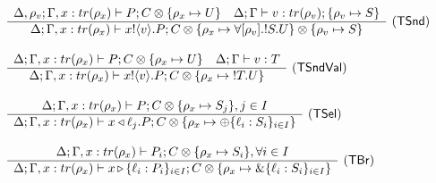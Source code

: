 \begin{frame}
\begin{figure}
{\[\begin{array}{ll}
      \\ \\
      \tree{
      \Delta, \rho_v; \Gamma, x: tr(\rho_x) \types P; C \otimes \{ \rho_x \mapsto U\}
        \andalso
      \Delta; \Gamma \types v : tr(\rho_v); \{\rho_v \mapsto S\}
      }{
      \Delta; \Gamma, x: tr(\rho_x) \types \pout{x}{v} P; C \otimes \{\rho_x \mapsto  \forall [\rho_v].\tout S U\} \otimes \{\rho_v \mapsto S\}
      }{\TSnd}
      \\ \\
      \tree{
      \Delta; \Gamma, x: tr(\rho_x) \types P; C \otimes \{ \rho_x \mapsto U\}
        \andalso
      \Delta; \Gamma \types v : T
      }{
      \Delta; \Gamma, x: tr(\rho_x) \types \pout{x}{v} P; C \otimes \{\rho_x \mapsto  \tout T U\}
        }{\TSndVal}
    \\ \\

      \tree{
      \Delta; \Gamma, x: tr(\rho_x) \types P; C \otimes \{\rho_x \mapsto S_j\}, j \in I
      }{
      \Delta; \Gamma, x : tr(\rho_x) \types \sel{x}{\ell_j} P; C \otimes \{\rho_x \mapsto \tselI{\ell}{S}\}
      }{\TSel}


      \\ \\
      \tree {
      \Delta; \Gamma, x : tr(\rho_x) \types P_i; C \otimes \{\rho_x \mapsto S_i\}, \forall i \in I
      }{
        \Delta; \Gamma, x : tr(\rho_x) \types \branch{x}{\ell_i:P_i}_{i \in I}; C \otimes \{\rho_x \mapsto \tbranchOn{\ell_i:S_i}_{i \in I}\}
      }{\TBr}
    \end{array}
    \]
    }
  \end{figure}
\end{frame}

